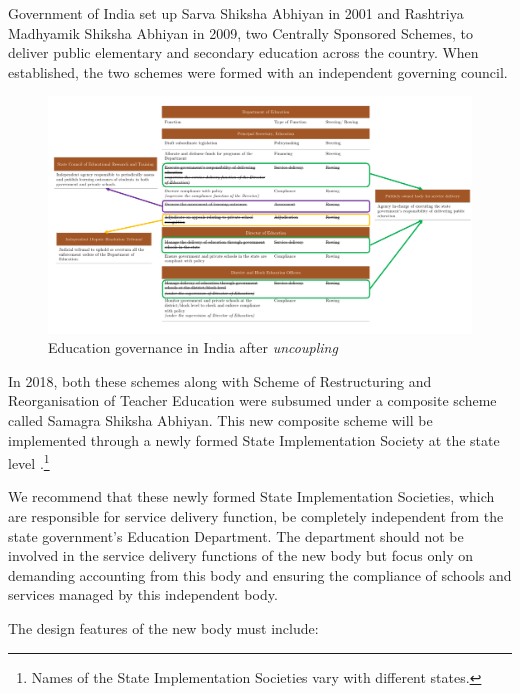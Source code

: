 \documentclass[a4paper, 12pt, twoside]{article}
\begin{document}
Government of India set up Sarva Shiksha Abhiyan in 2001 and Rashtriya Madhyamik Shiksha Abhiyan in 2009, two Centrally Sponsored Schemes, to deliver public elementary and secondary education across the country. When established, the two schemes were formed with an independent governing council. 



\begin{landscape}
\begin{figure}[H]
 \centering
\includegraphics[page=1, width = 23.2cm]{figure5}
\caption{Education governance in India after \textit{uncoupling}}
\end{figure}
\end{landscape}

In 2018, both these schemes along with Scheme of Restructuring and Reorganisation of Teacher Education were subsumed under a composite scheme called Samagra Shiksha Abhiyan. This new composite scheme will be implemented through a newly formed State Implementation Society at the state level \parencite{smsa_pubjab}.\footnote{Names of the State Implementation Societies vary with different states.} 

We recommend that these newly formed State Implementation Societies, which are responsible for service delivery function, be completely independent from the state government’s Education Department. The department should not be involved in the service delivery functions of the new body but focus only on demanding accounting from this body and ensuring the compliance of schools and services managed by this independent body. 

The design features of the new body must include: 
\end{document}
